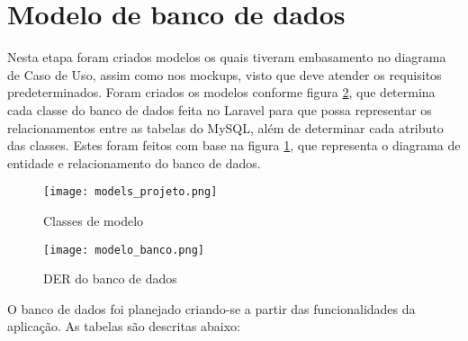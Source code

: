 \section{Modelo de banco de dados}
Nesta etapa foram criados modelos os quais tiveram embasamento no diagrama de Caso de Uso, assim como nos mockups, visto que deve atender os requisitos predeterminados. Foram criados os modelos conforme figura \ref{modelo_banco}, que determina cada classe do banco de dados feita no Laravel para que possa representar os relacionamentos entre as tabelas do MySQL, além de determinar cada atributo das classes. Estes foram feitos com base na figura \ref{models_projeto}, que representa o diagrama de entidade e relacionamento do banco de dados.
\begin{figure}[H]
    \caption{\label{models_projeto}Classes de modelo}
    \vspace{5pt}
    \centering
    \texttt{[image: models\_projeto.png]}
    \vspace{5pt}
\end{figure}
\begin{figure}[H]
    \caption{\label{modelo_banco}DER do banco de dados}
    \vspace{5pt}
    \centering
    \texttt{[image: modelo\_banco.png]}
    \vspace{5pt}
\end{figure}
O banco de dados foi planejado criando-se a partir das funcionalidades da aplicação. As tabelas são descritas abaixo:
